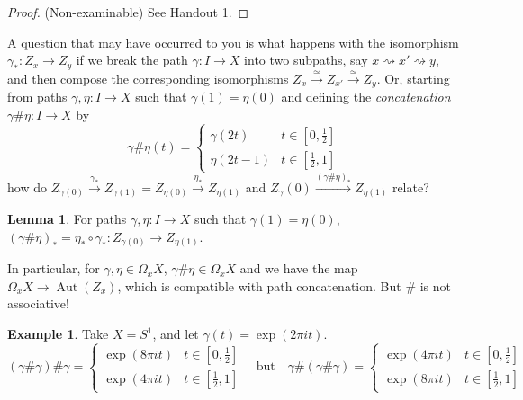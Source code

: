 \documentclass{tufte-handout}
\newcommand{\lecturenum}[1]{\marginnote{\color{red}Lecture #1}}
\DeclareMathOperator{\Aut}{Aut}
\theoremstyle{definition}
\newtheorem{lemma}{Lemma}
\newtheorem{example}{Example}
\begin{document}
\begin{proof}(Non-examinable)
See Handout 1.
\end{proof}


A\lecturenum{7} question that may have occurred to you is what happens with the isomorphism 
$\gamma_*\colon Z_x\to Z_y$ if we break the path $\gamma\colon I\to X$ into two 
subpaths, say $x\rightsquigarrow x' \rightsquigarrow y$, and then compose the 
corresponding isomorphisms $Z_x\xrightarrow{\simeq}Z_{x'}\xrightarrow{\simeq}Z_y$. Or, 
starting from paths $\gamma,\eta\colon I\to X$ such that $\gamma(1) = \eta(0)$ and 
defining the \emph{concatenation} $\gamma\#\eta\colon I\to X$ by
\[
	\gamma\#\eta(t) = \begin{cases}
		\gamma(2t) & t\in[0,\frac12]\\
		\eta(2t-1) & t \in[\frac12,1]
	\end{cases} 
\]
how do $Z_{\gamma(0)} \xrightarrow{\gamma_*} 
Z_{\gamma(1)}=Z_{\eta(0)}\xrightarrow{\eta_*}Z_{\eta(1)}$ and 
$Z_\gamma(0) \xrightarrow{(\gamma\#\eta)_*}Z_{\eta(1)}$ relate?

\begin{lemma}
For paths $\gamma,\eta\colon I\to X$ such that $\gamma(1) = \eta(0)$, 
$(\gamma\#\eta)_* = \eta_*\circ\gamma_*\colon Z_{\gamma(0)}\to Z_{\eta(1)}$.
\end{lemma}

In particular, for $\gamma,\eta\in \Omega_xX$, $\gamma\#\eta\in \Omega_xX$ and we have 
the map $\Omega_x X \to \Aut(Z_x)$, which is compatible with path concatenation. But 
$\#$ is not associative!

\begin{example}
Take $X=S^1$, and let $\gamma(t)=\exp(2\pi it)$.
\[
	(\gamma\#\gamma)\#\gamma = \begin{cases}
		\exp(8\pi it) & t\in[0,\frac12]\\
		\exp(4\pi it) & t \in[\frac12,1]
	\end{cases} \quad \text{but}\quad
	\gamma\#(\gamma\#\gamma) = \begin{cases}
		\exp(4\pi it) & t\in[0,\frac12]\\
		\exp(8\pi it) & t \in[\frac12,1]
	\end{cases}
\]
\end{example}
\end{document}
